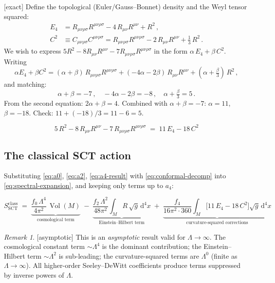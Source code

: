 \documentclass[12pt,a4paper]{article}
\theoremstyle{definition}
\theoremstyle{remark}
\newtheorem{remark}[proposition]{Remark}
\newcommand{\Vol}{\operatorname{Vol}}
\newcommand{\Rsq}{R_{\mu\nu\rho\sigma}R^{\mu\nu\rho\sigma}}
\newcommand{\Ricsq}{R_{\mu\nu}R^{\mu\nu}}
\newcommand{\Weylsq}{C_{\mu\nu\rho\sigma}C^{\mu\nu\rho\sigma}}
\newcommand{\dd}{\mathrm{d}}
\newcommand{\exact}{\textcolor{blue!70!black}{\textsf{[exact]}}}
\newcommand{\approxstep}{\textcolor{orange!80!black}{\textsf{[asymptotic]}}}
\begin{document}
\exact\;
Define the topological (Euler/Gauss--Bonnet) density and the Weyl
tensor squared:
\begin{align}
  E_4 &= \Rsq - 4\,\Ricsq + R^2\,,
  \label{eq:euler}\\[4pt]
  C^2 &\equiv \Weylsq = \Rsq - 2\,\Ricsq + \tfrac{1}{3}\,R^2\,.
  \label{eq:weyl}
\end{align}
We wish to express $5R^2 - 8\Ricsq - 7\Rsq$ in the form
$\alpha\, E_4 + \beta\, C^2$.  Writing
\begin{equation}
  \alpha E_4 + \beta C^2
  = (\alpha+\beta)\,\Rsq
  + (-4\alpha - 2\beta)\,\Ricsq
  + (\alpha + \tfrac{\beta}{3})\,R^2\,,
\end{equation}
and matching:
\[
  \alpha+\beta = -7\,,\quad
  -4\alpha-2\beta = -8\,,\quad
  \alpha+\tfrac{\beta}{3} = 5\,.
\]
From the second equation: $2\alpha+\beta=4$.  Combined with
$\alpha+\beta=-7$: $\alpha=11$, $\beta=-18$.  Check:
$11+(-18)/3 = 11-6=5$. \checkmark

\begin{equation}
  \boxed{
  5\,R^2 - 8\,\Ricsq - 7\,\Rsq
  \;=\;
  11\,E_4 - 18\,C^2
  }
  \label{eq:conformal-decomp}
\end{equation}


\subsection{The classical SCT action}

Substituting \eqref{eq:a0}, \eqref{eq:a2}, \eqref{eq:a4-result}
with \eqref{eq:conformal-decomp} into \eqref{eq:spectral-expansion},
and keeping only terms up to $a_4$:

\begin{equation}
  \boxed{
  S^{\mathrm{class}}_{\mathrm{SCT}}
  \;=\;
  \underbrace{
    \frac{f_0\,\Lambda^4}{4\pi^2}\,\Vol(M)
  }_{\text{cosmological term}}
  \;-\;
  \underbrace{
    \frac{f_2\,\Lambda^2}{48\pi^2}
    \int_M R\,\sqrt{g}\,\dd^4 x
  }_{\text{Einstein--Hilbert term}}
  \;+\;
  \underbrace{
    \frac{f_4}{16\pi^2\cdot 360}
    \int_M \bigl[11\,E_4 - 18\,C^2\bigr]\sqrt{g}\,\dd^4 x
  }_{\text{curvature-squared corrections}}
  }
  \label{eq:classical-SCT}
\end{equation}

\begin{remark}
\approxstep\;
This is an \emph{asymptotic} result valid for $\Lambda\to\infty$.
The cosmological constant term $\sim\Lambda^4$ is the dominant
contribution; the Einstein--Hilbert term $\sim\Lambda^2$ is
sub-leading; the curvature-squared terms are $\Lambda^0$ (finite as
$\Lambda\to\infty$).  All higher-order Seeley--DeWitt coefficients
produce terms suppressed by inverse powers of $\Lambda$.
\end{remark}
\end{document}
